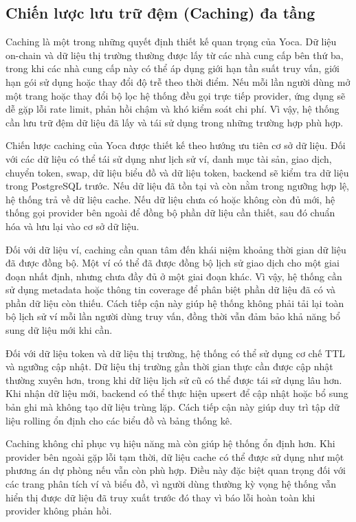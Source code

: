 \subsection{Chiến lược lưu trữ đệm (Caching) đa tầng}

Caching là một trong những quyết định thiết kế quan trọng của Yoca. Dữ liệu on-chain và dữ liệu thị trường thường được lấy từ các nhà cung cấp bên thứ ba, trong khi các nhà cung cấp này có thể áp dụng giới hạn tần suất truy vấn, giới hạn gói sử dụng hoặc thay đổi độ trễ theo thời điểm. Nếu mỗi lần người dùng mở một trang hoặc thay đổi bộ lọc hệ thống đều gọi trực tiếp provider, ứng dụng sẽ dễ gặp lỗi rate limit, phản hồi chậm và khó kiểm soát chi phí. Vì vậy, hệ thống cần lưu trữ đệm dữ liệu đã lấy và tái sử dụng trong những trường hợp phù hợp.

Chiến lược caching của Yoca được thiết kế theo hướng ưu tiên cơ sở dữ liệu. Đối với các dữ liệu có thể tái sử dụng như lịch sử ví, danh mục tài sản, giao dịch, chuyển token, swap, dữ liệu biểu đồ và dữ liệu token, backend sẽ kiểm tra dữ liệu trong PostgreSQL trước. Nếu dữ liệu đã tồn tại và còn nằm trong ngưỡng hợp lệ, hệ thống trả về dữ liệu cache. Nếu dữ liệu chưa có hoặc không còn đủ mới, hệ thống gọi provider bên ngoài để đồng bộ phần dữ liệu cần thiết, sau đó chuẩn hóa và lưu lại vào cơ sở dữ liệu.

Đối với dữ liệu ví, caching cần quan tâm đến khái niệm khoảng thời gian dữ liệu đã được đồng bộ. Một ví có thể đã được đồng bộ lịch sử giao dịch cho một giai đoạn nhất định, nhưng chưa đầy đủ ở một giai đoạn khác. Vì vậy, hệ thống cần sử dụng metadata hoặc thông tin coverage để phân biệt phần dữ liệu đã có và phần dữ liệu còn thiếu. Cách tiếp cận này giúp hệ thống không phải tải lại toàn bộ lịch sử ví mỗi lần người dùng truy vấn, đồng thời vẫn đảm bảo khả năng bổ sung dữ liệu mới khi cần.

Đối với dữ liệu token và dữ liệu thị trường, hệ thống có thể sử dụng cơ chế TTL và ngưỡng cập nhật. Dữ liệu thị trường gần thời gian thực cần được cập nhật thường xuyên hơn, trong khi dữ liệu lịch sử cũ có thể được tái sử dụng lâu hơn. Khi nhận dữ liệu mới, backend có thể thực hiện upsert để cập nhật hoặc bổ sung bản ghi mà không tạo dữ liệu trùng lặp. Cách tiếp cận này giúp duy trì tập dữ liệu rolling ổn định cho các biểu đồ và bảng thống kê.

Caching không chỉ phục vụ hiệu năng mà còn giúp hệ thống ổn định hơn. Khi provider bên ngoài gặp lỗi tạm thời, dữ liệu cache có thể được sử dụng như một phương án dự phòng nếu vẫn còn phù hợp. Điều này đặc biệt quan trọng đối với các trang phân tích ví và biểu đồ, vì người dùng thường kỳ vọng hệ thống vẫn hiển thị được dữ liệu đã truy xuất trước đó thay vì báo lỗi hoàn toàn khi provider không phản hồi.



